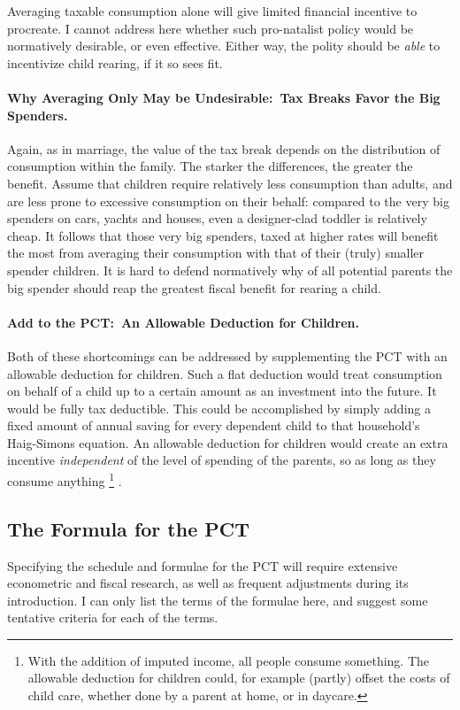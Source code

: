 Averaging taxable consumption alone will give limited financial incentive to procreate.
I cannot address here whether such pro-natalist policy would be normatively desirable, or even effective.
Either way, the polity should be \emph{able} to incentivize child rearing, if it so sees fit.

\paragraph{Why Averaging Only May be Undesirable:~Tax Breaks Favor the Big Spenders.}
Again, as in marriage, the value of the tax break depends on the distribution of consumption within the family.
The starker the differences, the greater the benefit.
Assume that children require relatively less consumption than adults, and are less prone to excessive consumption on their behalf:
compared to the very big spenders on cars, yachts and houses, even a designer-clad toddler is relatively cheap.
It follows that those very big spenders, taxed at higher rates will benefit the most from averaging their consumption with that of their (truly) smaller spender children.
It is hard to defend normatively why of all potential parents the big spender should reap the greatest fiscal benefit for rearing a child.

\paragraph{Add to the PCT:~An Allowable Deduction for Children.}
Both of these shortcomings can be addressed by supplementing the PCT with an allowable deduction for children.
Such a flat deduction would treat consumption on behalf of a child up to a certain amount as an investment into the future.
It would be fully tax deductible.
This could be accomplished by simply adding a fixed amount of annual saving for every dependent child to that household's Haig-Simons equation.
An allowable deduction for children would create an extra incentive \emph{independent} of the level of spending of the parents, so as long as they consume anything
\footnote{
	With the addition of imputed income, all people consume something.
	The allowable deduction for children could, for example (partly) offset the costs of child care, whether done by a parent at home, or in daycare.
}
.

\subsection{The Formula for the PCT}
Specifying the schedule and formulae for the PCT will require extensive econometric and fiscal research, as well as frequent adjustments during its introduction.
I can only list the terms of the formulae here, and suggest some tentative criteria for each of the terms.

